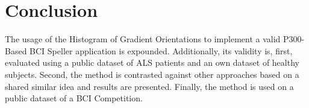 \section{Conclusion}




The usage of the Histogram of Gradient Orientations to implement a valid P300-Based BCI Speller application is expounded.  Additionally, its validity is, first, evaluated using a public dataset of ALS patients and an own dataset of healthy subjects.  Second, the method is contrasted against other approaches based on a shared similar idea and results are presented.  Finally, the method is used on a public dataset of a BCI Competition.


